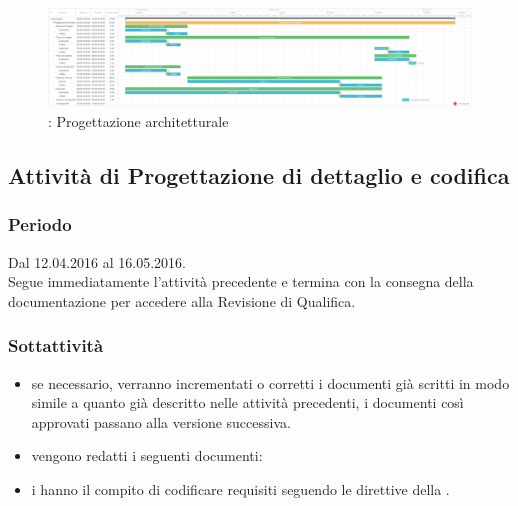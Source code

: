 \documentclass[a4paper, titlepage]{article}
\begin{document}
	\begin{figure}[!ht]
		\includegraphics[scale=0.2]{Img/Grafici_Gantt/Progettazione_architetturale.pdf}
		\caption{ : Progettazione architetturale}
	\end{figure}
	
	\subsection{Attività di Progettazione di dettaglio e codifica }
	\subsubsection{Periodo}
	Dal 12.04.2016 al 16.05.2016.\\
	Segue immediatamente l'attività precedente e termina con la consegna della documentazione per accedere alla Revisione di Qualifica.
	
	
	\subsubsection{Sottattività}
	\begin{itemize}
		\item {} se necessario, verranno incrementati o corretti i documenti già scritti in modo simile a quanto già descritto nelle attività precedenti, i documenti così approvati passano alla versione successiva.
		\item {} vengono redatti i seguenti documenti:
		\item {} i  hanno il compito di codificare  requisiti seguendo le direttive della .		 
	\end{itemize}
	
\end{document}
